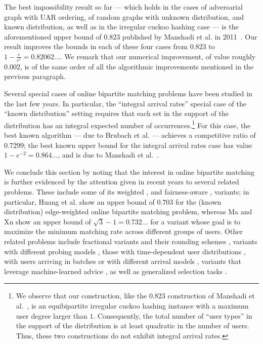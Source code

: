 \documentclass[11pt]{article}
\begin{document}
\smallskip

The best impossibility result so far --- which holds in the cases of adversarial graph with UAR ordering, of random graphs with unknown distribution, and known distribution, as well as in the irregular cuckoo hashing case --- is the aforementioned upper bound of $0.823$ published by Manshadi et al. in 2011~\cite{mos11}.
Our result improves the bounds in each of these four cases from $0.823$ to $1-\frac e{e^e} = 0.82062\ldots$. We remark that our numerical improvement, of value roughly $0.002$, is of the same order of all the algorithmic improvements mentioned in the previous paragraph.

\smallskip

Several special cases of online bipartite matching problems have been studied in the last few years. In particular, the ``integral arrival rates'' special case of the ``known distribution'' setting requires that each set in the support of the distribution has an integral expected number of occurrences.\footnote{We observe that our construction, like the  $0.823$ construction of Manshadi et al.~\cite{mos11}, is an equibipartite irregular cuckoo hashing instance with a maximum user degree larger than $1$. Consequently, the total number of ``user types'' in the support of the distribution is at least quadratic in the number of users. Thus, these two constructions do not exhibit integral arrival rates.} For this case, the best known algorithm --- due to Brubach et al. \cite{bssx16} --- achieves a competitive ratio of $0.7299$; the best known upper bound for the integral arrival rates case has value $1-e^{-2} = 0.864\ldots$, and is due to Manshadi et al.~\cite{mos12}.


\smallskip

We conclude this section by noting that the interest in online bipartite matching is further evidenced by the attention given in recent years to several related problems. These include some of its weighted \cite{hsy22,knr22,fhtz22}, and fairness-aware \cite{mx24},  variants; in particular, Huang et al. \cite{hsy22} show an upper bound of $0.703$ for the (known distribution) edge-weighted online bipartite matching problem, whereas Ma and Xu \cite{mx24} show an upper bound of $\sqrt{3} - 1 = 0.732\ldots$ for a variant whose goal is to maximize the minimum matching rate across different groups of users. Other related problems include fractional variants and their rounding schemes \cite{tz24, nsw25, ss18, bnw23,bsvw24}, variants with different probing models \cite{bm25,bmr21,bmr22}, those with time-dependent user distributions \cite{bdpsw25,tww22,ppsw21,bdm22}, with users arriving in batches \cite{fns21,fns24,jm22} or with different arrival models \cite{bst19,gkmsw19,efgt22}, variants that leverage machine-learned advice \cite{cglb24,agkk23,jm22}, as well as generalized selection tasks \cite{hjpsz24,ghhnyz21}.
\end{document}
